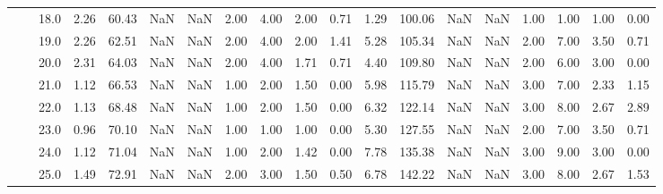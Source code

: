 \begin{tabular}{lllrrrrrrrrrrrrrrrr}
          &     & 18.0 &      2.26 &      60.43 &               NaN &                NaN &  2.00 &   4.00 &             2.00 &                         0.71 &      1.29 &     100.06 &               NaN &                NaN &  1.00 &   1.00 &             1.00 &                         0.00 \\
          &     & 19.0 &      2.26 &      62.51 &               NaN &                NaN &  2.00 &   4.00 &             2.00 &                         1.41 &      5.28 &     105.34 &               NaN &                NaN &  2.00 &   7.00 &             3.50 &                         0.71 \\
          &     & 20.0 &      2.31 &      64.03 &               NaN &                NaN &  2.00 &   4.00 &             1.71 &                         0.71 &      4.40 &     109.80 &               NaN &                NaN &  2.00 &   6.00 &             3.00 &                         0.00 \\
          &     & 21.0 &      1.12 &      66.53 &               NaN &                NaN &  1.00 &   2.00 &             1.50 &                         0.00 &      5.98 &     115.79 &               NaN &                NaN &  3.00 &   7.00 &             2.33 &                         1.15 \\
          &     & 22.0 &      1.13 &      68.48 &               NaN &                NaN &  1.00 &   2.00 &             1.50 &                         0.00 &      6.32 &     122.14 &               NaN &                NaN &  3.00 &   8.00 &             2.67 &                         2.89 \\
          &     & 23.0 &      0.96 &      70.10 &               NaN &                NaN &  1.00 &   1.00 &             1.00 &                         0.00 &      5.30 &     127.55 &               NaN &                NaN &  2.00 &   7.00 &             3.50 &                         0.71 \\
          &     & 24.0 &      1.12 &      71.04 &               NaN &                NaN &  1.00 &   2.00 &             1.42 &                         0.00 &      7.78 &     135.38 &               NaN &                NaN &  3.00 &   9.00 &             3.00 &                         0.00 \\
          &     & 25.0 &      1.49 &      72.91 &               NaN &                NaN &  2.00 &   3.00 &             1.50 &                         0.50 &      6.78 &     142.22 &               NaN &                NaN &  3.00 &   8.00 &             2.67 &                         1.53 \\

\end{tabular}
